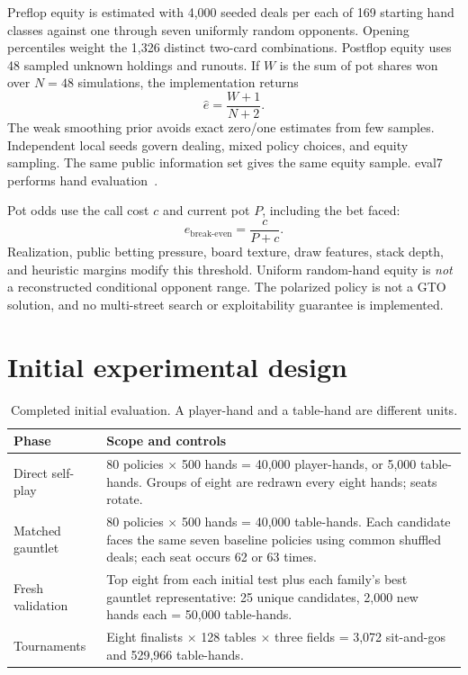 \documentclass[11pt,letterpaper]{article}
\begin{document}
Preflop equity is estimated with 4,000 seeded deals per each of 169 starting
hand classes against one through seven uniformly random opponents. Opening
percentiles weight the 1,326 distinct two-card combinations. Postflop equity
uses 48 sampled unknown holdings and runouts. If $W$ is the sum of pot shares
won over $N=48$ simulations, the implementation returns
\begin{equation}
\widehat{e}=\frac{W+1}{N+2}.
\end{equation}
The weak smoothing prior avoids exact zero/one estimates from few samples.
Independent local seeds govern dealing, mixed policy choices, and equity
sampling. The same public information set gives the same equity sample.
eval7 performs hand evaluation~\cite{eval7}.

Pot odds use the call cost $c$ and current pot $P$, including the bet faced:
\begin{equation}
e_{\mathrm{break\text{-}even}}=\frac{c}{P+c}.
\end{equation}
Realization, public betting pressure, board texture, draw features, stack
depth, and heuristic margins modify this threshold. Uniform random-hand
equity is \emph{not} a reconstructed conditional opponent range. The
polarized policy is not a GTO solution, and no multi-street search or
exploitability guarantee is implemented.

\section{Initial experimental design}
\begin{table}[htbp]
\centering\small
\caption{Completed initial evaluation. A player-hand and a table-hand are different units.}
\begin{tabularx}{\linewidth}{@{}p{1.25in}Y@{}}
\toprule Phase & Scope and controls \\\midrule
Direct self-play & 80 policies $\times$ 500 hands = 40,000 player-hands, or 5,000 table-hands. Groups of eight are redrawn every eight hands; seats rotate. \\
Matched gauntlet & 80 policies $\times$ 500 hands = 40,000 table-hands. Each candidate faces the same seven baseline policies using common shuffled deals; each seat occurs 62 or 63 times. \\
Fresh validation & Top eight from each initial test plus each family's best gauntlet representative: 25 unique candidates, 2,000 new hands each = 50,000 table-hands. \\
Tournaments & Eight finalists $\times$ 128 tables $\times$ three fields = 3,072 sit-and-gos and 529,966 table-hands. \\
\bottomrule
\end{tabularx}
\end{table}
\end{document}

